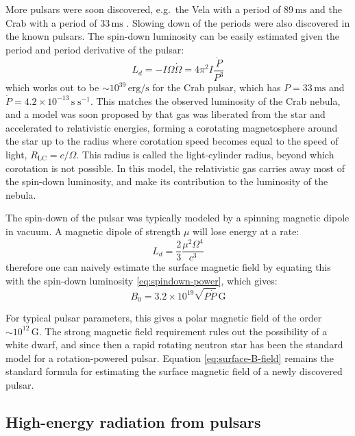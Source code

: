 More pulsars were soon discovered, e.g.\ the Vela with a period of
$89\,\mathrm{ms}$ \citep{large_pulsar_1968} and the Crab with a period of
$33\,\mathrm{ms}$ \citep{lovelace_pulsar_1968}. Slowing down of the periods were
also discovered in the known pulsars. The spin-down luminosity can be easily
estimated given the period and period derivative of the pulsar:
\begin{equation}
  \label{eq:spindown-power}
  L_{d} = -I\Omega\dot{\Omega} = 4\pi^2 I\frac{\dot{P}}{P^3}
\end{equation}
which works out to be $\sim 10^{39}\,\mathrm{erg/s}$ for the Crab pulsar, which
has $P = 33\,\mathrm{ms}$ and $\dot{P} = 4.2\times
10^{-13}\,\mathrm{s\;s^{-1}}$. This matches the observed luminosity of the Crab
nebula, and a model was soon proposed by \citet{gold_rotating_1969} that gas was
liberated from the star and accelerated to relativistic energies, forming a
corotating magnetosphere around the star up to the radius where corotation speed
becomes equal to the speed of light, $R_\mathrm{LC} = c/\Omega$. This radius is
called the light-cylinder radius, beyond which corotation is not possible. In
this model, the relativistic gas carries away most of the spin-down luminosity,
and make its contribution to the luminosity of the nebula.

The spin-down of the pulsar was typically modeled by a spinning magnetic dipole
in vacuum. A magnetic dipole of strength $\mu$ will lose energy at a rate:
\begin{equation}
  \label{eq:dipole-spin-down}
  L_{d} = \frac{2}{3}\frac{\mu^2\Omega^4}{c^3}
\end{equation}
therefore one can naively estimate the surface magnetic field by equating this
with the spin-down luminosity \eqref{eq:spindown-power}, which gives:
\begin{equation}
  \label{eq:surface-B-field}
  B_0 = 3.2\times 10^{19}\sqrt{P \dot{P}}\,\mathrm{G}
\end{equation}

For typical pulsar parameters, this gives a polar magnetic field of the order
$\sim 10^{12}\,\mathrm{G}$. The strong magnetic field requirement rules out the
possibility of a white dwarf, and since then a rapid rotating neutron star has
been the standard model for a rotation-powered pulsar. Equation
\eqref{eq:surface-B-field} remains the standard formula for estimating the surface
magnetic field of a newly discovered pulsar.

\subsection{High-energy radiation from pulsars}
\label{sec:observ-high-energy}

